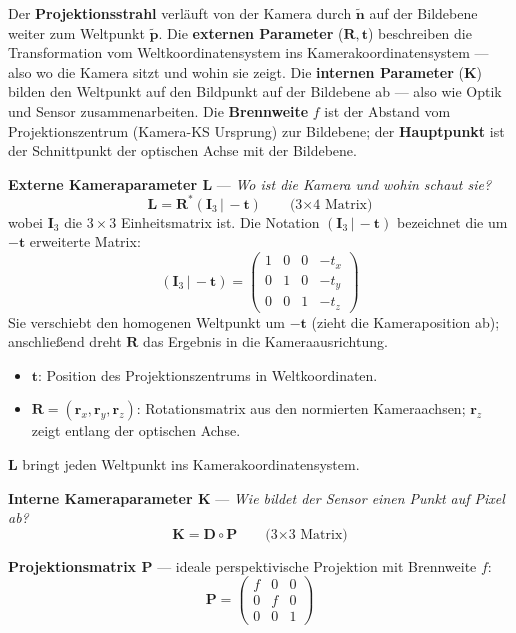 \documentclass[12pt, a4paper]{article}
\begin{document}
Der \textbf{Projektionsstrahl} verläuft von der Kamera durch $\tilde{\mathbf{n}}$ auf der Bildebene weiter zum Weltpunkt $\tilde{\mathbf{p}}$. Die \textbf{externen Parameter} ($\mathbf{R}, \mathbf{t}$) beschreiben die Transformation vom Weltkoordinatensystem ins Kamerakoordinatensystem — also wo die Kamera sitzt und wohin sie zeigt. Die \textbf{internen Parameter} ($\mathbf{K}$) bilden den Weltpunkt auf den Bildpunkt auf der Bildebene ab — also wie Optik und Sensor zusammenarbeiten. Die \textbf{Brennweite} $f$ ist der Abstand vom Projektionszentrum (Kamera-KS Ursprung) zur Bildebene; der \textbf{Hauptpunkt} ist der Schnittpunkt der optischen Achse mit der Bildebene.

\medskip
\textbf{Externe Kameraparameter L} — \textit{Wo ist die Kamera und wohin schaut sie?}
\[
  \mathbf{L} = \mathbf{R}^*(\mathbf{I}_3\,|\,-\mathbf{t})
  \qquad \text{(3×4 Matrix)}
\]
wobei $\mathbf{I}_3$ die $3\times3$ Einheitsmatrix ist. Die Notation $(\mathbf{I}_3\,|\,-\mathbf{t})$ bezeichnet die um $-\mathbf{t}$ erweiterte Matrix:
\[
  (\mathbf{I}_3\,|\,-\mathbf{t}) =
  \begin{pmatrix}1&0&0&-t_x\\0&1&0&-t_y\\0&0&1&-t_z\end{pmatrix}
\]
Sie verschiebt den homogenen Weltpunkt um $-\mathbf{t}$ (zieht die Kameraposition ab); anschließend dreht $\mathbf{R}$ das Ergebnis in die Kameraausrichtung.
\begin{itemize}
  \item $\mathbf{t}$: Position des Projektionszentrums in Weltkoordinaten.
  \item $\mathbf{R} = (\mathbf{r}_x, \mathbf{r}_y, \mathbf{r}_z)$: Rotationsmatrix aus den normierten Kameraachsen; $\mathbf{r}_z$ zeigt entlang der optischen Achse.
\end{itemize}
$\mathbf{L}$ bringt jeden Weltpunkt ins Kamerakoordinatensystem.

\medskip
\textbf{Interne Kameraparameter K} — \textit{Wie bildet der Sensor einen Punkt auf Pixel ab?}
\[
  \mathbf{K} = \mathbf{D} \circ \mathbf{P}
  \qquad \text{(3×3 Matrix)}
\]

\textbf{Projektionsmatrix P} — ideale perspektivische Projektion mit Brennweite $f$:
\[
  \mathbf{P} = \begin{pmatrix}f&0&0\\0&f&0\\0&0&1\end{pmatrix}
\]
\end{document}
